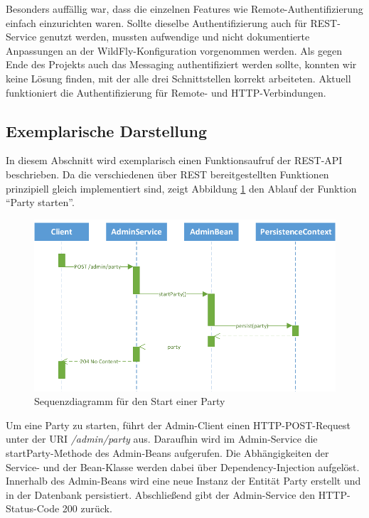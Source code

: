 Besonders auffällig war, dass die einzelnen Features wie Remote-Authentifizierung einfach einzurichten waren. Sollte dieselbe Authentifizierung auch für REST-Service genutzt werden, mussten aufwendige und nicht dokumentierte Anpassungen an der WildFly-Konfiguration vorgenommen werden. Als gegen Ende des Projekts auch das Messaging authentifiziert werden sollte, konnten wir keine Lösung finden, mit der alle drei Schnittstellen korrekt arbeiteten. Aktuell funktioniert die Authentifizierung für Remote- und HTTP-Verbindungen. 


\subsection{Exemplarische Darstellung}
In diesem Abschnitt wird exemplarisch einen Funktionsaufruf der REST-API beschrieben. Da die verschiedenen über REST bereitgestellten Funktionen prinzipiell gleich implementiert sind, zeigt Abbildung \ref{fig:AufrufSequenz} den Ablauf der Funktion "`Party starten"'.

\begin{figure}[tbh]
\centering
\includegraphics[width=1.0\linewidth]{Bilder/AufrufSequenz}
\caption{Sequenzdiagramm für den Start einer Party}
\label{fig:AufrufSequenz}
\end{figure}

Um eine Party zu starten, führt der Admin-Client einen HTTP-POST-Request unter der URI \textit{/admin/party} aus. Daraufhin wird im Admin-Service die startParty-Methode des Admin-Beans aufgerufen. Die Abhängigkeiten der Service- und der Bean-Klasse werden dabei über Dependency-Injection aufgelöst. Innerhalb des Admin-Beans wird eine neue Instanz der Entität Party erstellt und in der Datenbank persistiert. Abschließend gibt der Admin-Service den HTTP-Status-Code 200 zurück.

